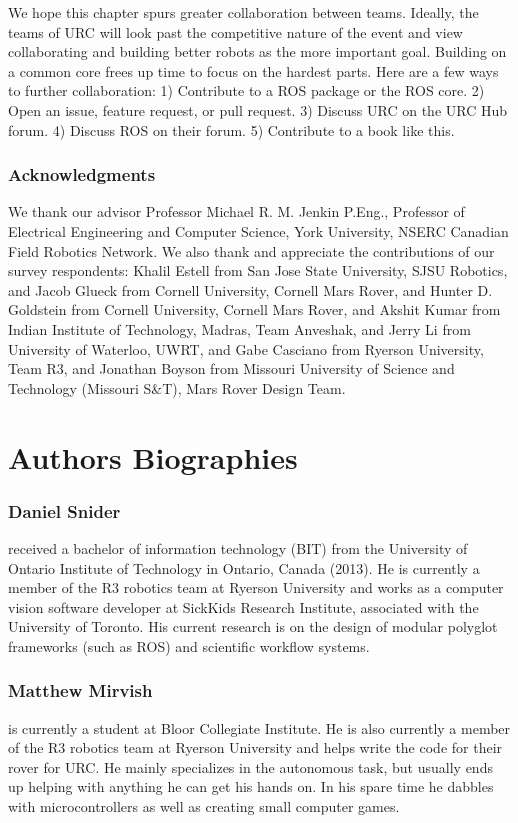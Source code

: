 \documentclass[runningheads,a4paper]{llncs}
\begin{document}
We hope this chapter spurs greater collaboration between teams. Ideally, the teams of URC will look past the competitive nature of the event and view collaborating and building better robots as the more important goal. Building on a common core frees up time to focus on the hardest parts. Here are a few ways to further collaboration: 1) Contribute to a ROS package or the ROS core. 2) Open an issue, feature request, or pull request. 3) Discuss URC on the URC Hub forum. 4) Discuss ROS on their forum. 5) Contribute to a book like this.



\subsubsection*{Acknowledgments} We thank our advisor Professor Michael R. M. Jenkin P.Eng., Professor of Electrical Engineering and Computer Science, York University, NSERC Canadian Field Robotics Network. We also thank and appreciate the contributions of our survey respondents: Khalil Estell from San Jose State University, SJSU Robotics, and Jacob Glueck from Cornell University, Cornell Mars Rover, and Hunter D. Goldstein from Cornell University, Cornell Mars Rover, and Akshit Kumar from Indian Institute of Technology, Madras, Team Anveshak, and Jerry Li from University of Waterloo, UWRT, and Gabe Casciano from Ryerson University, Team R3, and Jonathan Boyson from Missouri University of Science and Technology (Missouri S\&T), Mars Rover Design Team.

\printbibliography

\section*{Authors Biographies}

\subsubsection*{Daniel Snider} received a bachelor of information technology (BIT) from the University of Ontario Institute of Technology in Ontario, Canada (2013). He is currently a member of the R3 robotics team at Ryerson University and works as a computer vision software developer at SickKids Research Institute, associated with the University of Toronto. His current research is on the design of modular polyglot frameworks (such as ROS) and scientific workflow systems.

\subsubsection*{Matthew Mirvish} is currently a student at Bloor Collegiate Institute. He is also currently a member of the R3 robotics team at Ryerson University and helps write the code for their rover for URC. He mainly specializes in the autonomous task, but usually ends up helping with anything he can get his hands on. In his spare time he dabbles with microcontrollers as well as creating small computer games.
\end{document}
